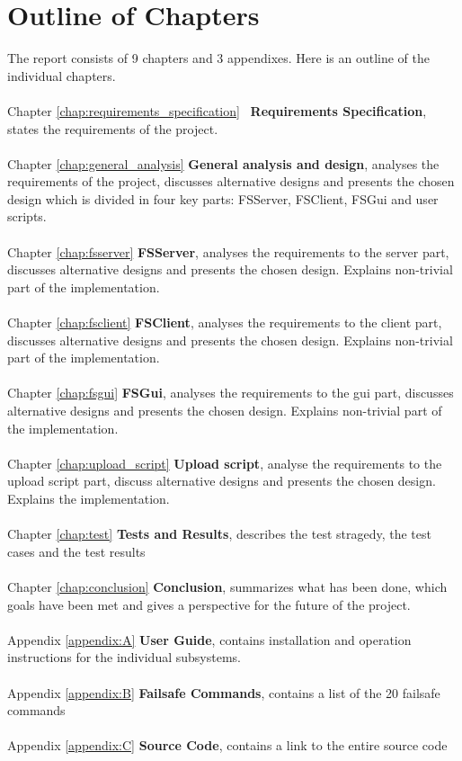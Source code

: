 \section{Outline of Chapters}
The report consists of 9 chapters and 3 appendixes. Here is an outline of the individual chapters.
\\ \\
Chapter \ref{chap:requirements_specification} \ \textbf{Requirements Specification}, states the requirements of the project.
\\ \\
Chapter \ref{chap:general_analysis} \textbf{General analysis and design}, analyses the requirements of the project, discusses alternative designs and presents the chosen design which is divided in four key parts: FSServer, FSClient, FSGui and user scripts.
\\ \\
Chapter \ref{chap:fsserver} \textbf{FSServer}, analyses the requirements to the server part, discusses alternative designs and presents the chosen design. Explains non-trivial part of the implementation.
\\ \\
Chapter \ref{chap:fsclient} \textbf{FSClient}, analyses the requirements to the client part, discusses alternative designs and presents the chosen design. Explains non-trivial part of the implementation.
\\ \\
Chapter \ref{chap:fsgui} \textbf{FSGui}, analyses the requirements to the gui part, discusses alternative designs and presents the chosen design. Explains non-trivial part of the implementation.
\\ \\
Chapter \ref{chap:upload_script} \textbf{Upload script}, analyse the requirements to the upload script part, discuss alternative designs and presents the chosen design. Explains the implementation.
\\ \\
Chapter \ref{chap:test} \textbf{Tests and Results}, describes the test stragedy, the test cases and the test results
\\ \\
Chapter \ref{chap:conclusion} \textbf{Conclusion}, summarizes what has been done, which goals have been met and gives a perspective for the future of the project.
\\ \\
Appendix \ref{appendix:A} \textbf{User Guide}, contains installation and operation instructions for the individual subsystems.
\\ \\
Appendix \ref{appendix:B} \textbf{Failsafe Commands}, contains a list of the 20 failsafe commands
\\ \\
Appendix \ref{appendix:C} \textbf{Source Code}, contains a link to the entire source code
